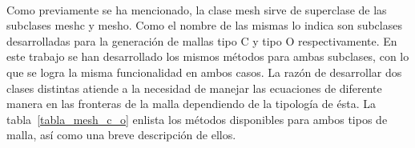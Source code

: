 \documentclass[letterpaper, openright, 12pt]{book}
\begin{document}
    \paragraph*{}
        Como previamente se ha mencionado, la clase mesh sirve de superclase de
        las subclases mesh\textunderscore c y mesh\textunderscore o. Como el
        nombre de las mismas lo indica son subclases desarrolladas para la
        generación de mallas tipo C y tipo O respectivamente. En este trabajo se
        han desarrollado los mismos métodos para ambas subclases, con lo que se
        logra la misma funcionalidad en ambos casos. La razón de desarrollar dos
        clases distintas atiende a la necesidad de manejar las ecuaciones de
        diferente manera en las fronteras de la malla dependiendo de la
        tipología de ésta. La tabla~\ref{tabla_mesh_c_o} enlista los métodos
        disponibles para ambos tipos de malla, así como una breve descripción de
        ellos.
\end{document}

